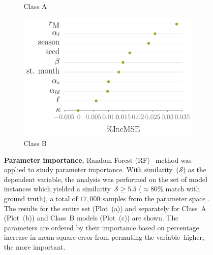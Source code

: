 \documentclass[11pt]{article}
\newcommand{\similarity}{\mathcal{S}}
\theoremstyle{definition}
\begin{document}
\begin{figure}[t]
\begin{subfigure}[b]{.32\textwidth}
\caption{Class A\label{fig:rfShort}}
\end{subfigure}
\begin{subfigure}[b]{.32\textwidth}
\includegraphics[width=1.1\textwidth]{../cellular_automata/results/rf/rf_importance_long_mse.pdf}
\caption{Class B\label{fig:rfLong}}
\end{subfigure}
\caption{\textbf{Parameter importance.} Random Forest
(RF)~\cite{breiman2001random} method was applied to study parameter
importance. With similarity~($\similarity$) as the dependent variable,
the analysis was performed on the set of model instances which yielded
a similarity~$\similarity\ge5.5$ ($\approx80$\% match with ground
truth), a total of $17,000$ samples from the
parameter space . The results for the entire set (Plot~(a))
and separately for Class~A (Plot~(b)) and Class~B models (Plot~(c)) are
shown. The parameters are ordered by their importance based on percentage
increase in mean square error from permuting the variable--higher, the more
important. \label{fig:sensitivity}}
\end{figure}
\end{document}
